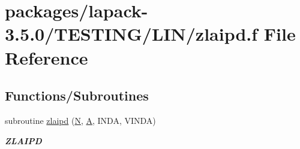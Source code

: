 \hypertarget{zlaipd_8f}{}\section{packages/lapack-\/3.5.0/\+T\+E\+S\+T\+I\+N\+G/\+L\+I\+N/zlaipd.f File Reference}
\label{zlaipd_8f}
\subsection*{Functions/\+Subroutines}
\begin{DoxyCompactItemize}
\item 
subroutine \hyperlink{group__complex16__lin_ga79ad3457281a864241d40aa4e1ee2d04}{zlaipd} (\hyperlink{polmisc_8c_a0240ac851181b84ac374872dc5434ee4}{N}, \hyperlink{classA}{A}, I\+N\+D\+A, V\+I\+N\+D\+A)
\begin{DoxyCompactList}\small\item\em {\bfseries Z\+L\+A\+I\+P\+D} \end{DoxyCompactList}\end{DoxyCompactItemize}
